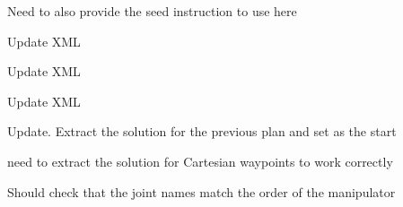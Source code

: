 \begin{DoxyRefList}
\label{todo__todo000020}%
%
Need to also provide the seed instruction to use here  
\item[Member \mbox{\hyperlink{classtesseract__planning_1_1OMPLDefaultPlanProfile_a46c010d4fcdb918631ac92016d3bfccd}{tesseract\+\_\+planning\+::OMPLDefault\+Plan\+Profile\+::OMPLDefault\+Plan\+Profile}} (const tinyxml2\+::\+XMLElement \&xml\+\_\+element)]\label{todo__todo000016}%
%
Update XML 

\label{todo__todo000017}%
%
Update XML  
\item[Member \mbox{\hyperlink{classtesseract__planning_1_1OMPLDefaultPlanProfile_a9ceeaf8d8a01e483992a71b15cb32df4}{tesseract\+\_\+planning\+::OMPLDefault\+Plan\+Profile\+::to\+XML}} (tinyxml2\+::\+XMLDocument \&doc) const override]\label{todo__todo000021}%
%
Update XML  
\item[Member \mbox{\hyperlink{classtesseract__planning_1_1OMPLMotionPlanner_a11312a30312549a148c46a54eed5505f}{tesseract\+\_\+planning\+::OMPLMotion\+Planner\+::create\+Problems}} (const std\+::string \&name, const \mbox{\hyperlink{structtesseract__planning_1_1PlannerRequest}{Planner\+Request}} \&request) const]\label{todo__todo000014}%
%
Update. Extract the solution for the previous plan and set as the start 

\label{todo__todo000015}%
%
need to extract the solution for Cartesian waypoints to work correctly 

\label{todo__todo000012}%
%
Should check that the joint names match the order of the manipulator 


\end{DoxyRefList}
